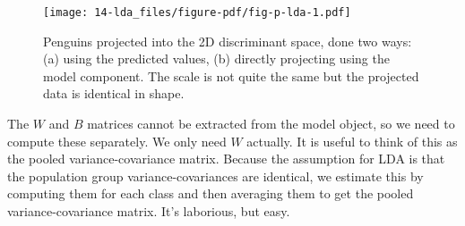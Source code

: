 \documentclass[
  letterpaper,
]{krantz}
\newenvironment{Shaded}{\begin{snugshade}}{\end{snugshade}}
\newcommand{\AttributeTok}[1]{\textcolor[rgb]{0.40,0.45,0.13}{#1}}
\newcommand{\CommentTok}[1]{\textcolor[rgb]{0.37,0.37,0.37}{#1}}
\newcommand{\ConstantTok}[1]{\textcolor[rgb]{0.56,0.35,0.01}{#1}}
\newcommand{\DecValTok}[1]{\textcolor[rgb]{0.68,0.00,0.00}{#1}}
\newcommand{\FloatTok}[1]{\textcolor[rgb]{0.68,0.00,0.00}{#1}}
\newcommand{\FunctionTok}[1]{\textcolor[rgb]{0.28,0.35,0.67}{#1}}
\newcommand{\NormalTok}[1]{\textcolor[rgb]{0.00,0.23,0.31}{#1}}
\newcommand{\OtherTok}[1]{\textcolor[rgb]{0.00,0.23,0.31}{#1}}
\newcommand{\SpecialCharTok}[1]{\textcolor[rgb]{0.37,0.37,0.37}{#1}}
\newcommand{\StringTok}[1]{\textcolor[rgb]{0.13,0.47,0.30}{#1}}
\begin{document}
\begin{Shaded}
\end{Shaded}

\begin{figure}[H]

{\centering \texttt{[image: 14-lda\_files/figure-pdf/fig-p-lda-1.pdf]}

}

\caption{\label{fig-p-lda}Penguins projected into the 2D discriminant
space, done two ways: (a) using the predicted values, (b) directly
projecting using the model component. The scale is not quite the same
but the projected data is identical in shape.}

\end{figure}

The \(W\) and \(B\) matrices cannot be extracted from the model object,
so we need to compute these separately. We only need \(W\) actually. It
is useful to think of this as the pooled variance-covariance matrix.
Because the assumption for LDA is that the population group
variance-covariances are identical, we estimate this by computing them
for each class and then averaging them to get the pooled
variance-covariance matrix. It's laborious, but easy.
\end{document}
